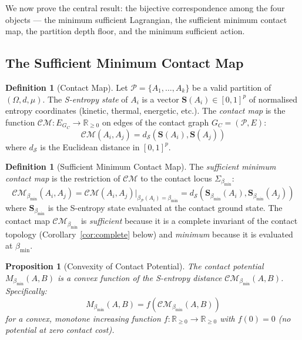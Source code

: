 \documentclass[11pt,twocolumn,a4paper]{article}
\theoremstyle{plain}
\newtheorem{proposition}[theorem]{Proposition}
\theoremstyle{definition}
\newtheorem{definition}[theorem]{Definition}
\theoremstyle{remark}
\newcommand{\bmin}{\beta_{\min}}
\newcommand{\CM}{\mathcal{CM}}
\newcommand{\dS}{d_{\mathcal{S}}}
\newcommand{\reals}{\mathbb{R}}
\newcommand{\Pcal}{\mathcal{P}}
\begin{document}
We now prove the central result: the bijective correspondence among the four
objects --- the minimum sufficient Lagrangian, the sufficient minimum contact
map, the partition depth floor, and the minimum sufficient action.

\subsection{The Sufficient Minimum Contact Map}

\begin{definition}[Contact Map]
\label{def:contactmap}
Let $\Pcal = \{A_1, \ldots, A_k\}$ be a valid partition of $(\Omega, d, \mu)$.
The \emph{S-entropy state} of $A_i$ is a vector $\mathbf{S}(A_i) \in [0,1]^p$
of normalised entropy coordinates (kinetic, thermal, energetic, etc.).
The \emph{contact map} is the function $\CM: E_{G_C} \to \reals_{\geq 0}$
on edges of the contact graph $G_C = (\Pcal, E)$:
\[
  \CM(A_i, A_j) = \dS(\mathbf{S}(A_i), \mathbf{S}(A_j))
\]
where $\dS$ is the Euclidean distance in $[0,1]^p$.
\end{definition}

\begin{definition}[Sufficient Minimum Contact Map]
\label{def:smcm}
The \emph{sufficient minimum contact map} is the restriction of $\CM$ to the
contact locus $\Sigma_{\bmin}$:
\[
  \CM_{\bmin}(A_i, A_j) = \CM(A_i, A_j)\big|_{\beta_\Pcal(A_i) = \bmin}
  = \dS(\mathbf{S}_{\bmin}(A_i), \mathbf{S}_{\bmin}(A_j))
\]
where $\mathbf{S}_{\bmin}$ is the S-entropy state evaluated at the contact
ground state. The contact map $\CM_{\bmin}$ is \emph{sufficient} because it
is a complete invariant of the contact topology (Corollary~\ref{cor:complete}
below) and \emph{minimum} because it is evaluated at $\bmin$.
\end{definition}

\begin{proposition}[Convexity of Contact Potential]
\label{prop:convex}
The contact potential $M_{\bmin}(A,B)$ is a convex function of the S-entropy
distance $\CM_{\bmin}(A,B)$. Specifically:
\[
  M_{\bmin}(A,B) = f\!\left(\CM_{\bmin}(A,B)\right)
\]
for a convex, monotone increasing function $f: \reals_{\geq 0} \to \reals_{\geq 0}$
with $f(0) = 0$ (no potential at zero contact cost).
\end{proposition}
\end{document}
